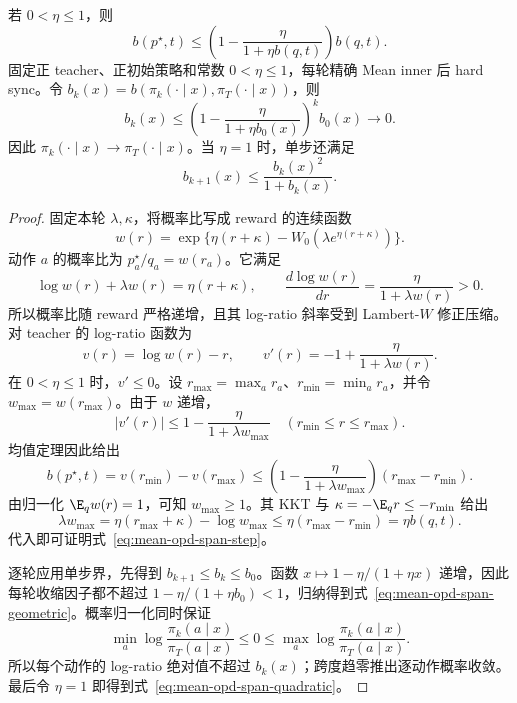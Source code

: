 \begin{theorem}
\label{thm:mean-opd-span-convergence}
若 $0<\eta\le1$，则
\begin{equation}
 b(p^\star,t)
 \le\left(1-\frac{\eta}{1+\eta b(q,t)}\right)b(q,t).
 \label{eq:mean-opd-span-step}
\end{equation}
固定正 teacher、正初始策略和常数 $0<\eta\le1$，每轮精确 Mean inner 后 hard sync。令 $b_k(x)=b(\pi_k(\cdot\mid x),\pi_T(\cdot\mid x))$，则
\begin{equation}
 b_k(x)\le
 \left(1-\frac{\eta}{1+\eta b_0(x)}\right)^k b_0(x)
 \longrightarrow0.
 \label{eq:mean-opd-span-geometric}
\end{equation}
因此 $\pi_k(\cdot\mid x)\to\pi_T(\cdot\mid x)$。当 $\eta=1$ 时，单步还满足
\begin{equation}
 b_{k+1}(x)\le\frac{b_k(x)^2}{1+b_k(x)}.
 \label{eq:mean-opd-span-quadratic}
\end{equation}
\end{theorem}

\begin{proof}
固定本轮 $\lambda,\kappa$，将概率比写成 reward 的连续函数
\[
 w(r)=\exp\{\eta(r+\kappa)-W_0(\lambda e^{\eta(r+\kappa)})\}.
\]
动作 $a$ 的概率比为 $p_a^\star/q_a=w(r_a)$。它满足
\[
 \log w(r)+\lambda w(r)=\eta(r+\kappa),
 \qquad
 \frac{d\log w(r)}{dr}=\frac{\eta}{1+\lambda w(r)}>0.
\]
所以概率比随 reward 严格递增，且其 log-ratio 斜率受到 Lambert-$W$ 修正压缩。对 teacher 的 log-ratio 函数为
\[
 v(r)=\log w(r)-r,
 \qquad v'(r)=-1+\frac{\eta}{1+\lambda w(r)}.
\]
在 $0<\eta\le1$ 时，$v'\le0$。设 $r_{\max}=\max_a r_a$、$r_{\min}=\min_a r_a$，并令 $w_{\max}=w(r_{\max})$。由于 $w$ 递增，
\[
 |v'(r)|\le1-\frac{\eta}{1+\lambda w_{\max}}
 \quad (r_{\min}\le r\le r_{\max}).
\]
均值定理因此给出
\[
 b(p^\star,t)=v(r_{\min})-v(r_{\max})
 \le\left(1-\frac{\eta}{1+\lambda w_{\max}}\right)
       (r_{\max}-r_{\min}).
\]
由归一化 $\E_qw(r)=1$，可知 $w_{\max}\ge1$。其 KKT 与 $\kappa=-\E_qr\le-r_{\min}$ 给出
\[
 \lambda w_{\max}
 =\eta(r_{\max}+\kappa)-\log w_{\max}
 \le\eta(r_{\max}-r_{\min})=\eta b(q,t).
\]
代入即可证明式~\eqref{eq:mean-opd-span-step}。

逐轮应用单步界，先得到 $b_{k+1}\le b_k\le b_0$。函数 $x\mapsto1-\eta/(1+\eta x)$ 递增，因此每轮收缩因子都不超过 $1-\eta/(1+\eta b_0)<1$，归纳得到式~\eqref{eq:mean-opd-span-geometric}。概率归一化同时保证
\[
 \min_a\log\frac{\pi_k(a\mid x)}{\pi_T(a\mid x)}
 \le0\le
 \max_a\log\frac{\pi_k(a\mid x)}{\pi_T(a\mid x)}.
\]
所以每个动作的 log-ratio 绝对值不超过 $b_k(x)$；跨度趋零推出逐动作概率收敛。最后令 $\eta=1$ 即得到式~\eqref{eq:mean-opd-span-quadratic}。
\end{proof}

